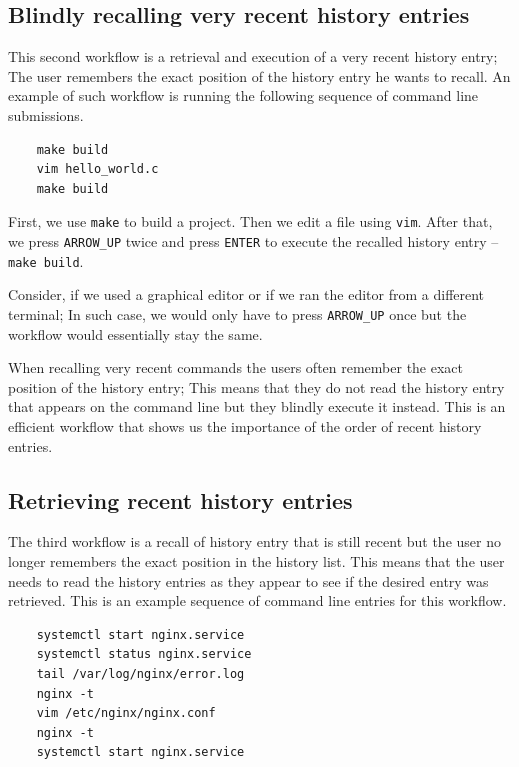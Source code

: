 \documentclass[thesis=M,english]{FITthesis}[2012/10/20]
\newcommand{\todotext}[1]{\textcolor{red}{\textbf{[[#1]]}}}
\begin{document}

\subsection{Blindly recalling very recent history entries}

This second workflow is a retrieval and execution of a very recent history entry; The user remembers the exact position of the history entry he wants to recall. An example of such workflow is running the following sequence of command line submissions.
\begin{verbatim}
    make build
    vim hello_world.c
    make build
\end{verbatim}
First, we use \verb|make| to build a project. Then we edit a file using \verb|vim|. After that, we press \verb|ARROW_UP| twice and press \verb|ENTER| to execute the recalled history entry -- \verb|make build|. 

Consider, if we used a graphical editor or if we ran the editor from a different terminal; In such case, we would only have to press \verb|ARROW_UP| once but the workflow would essentially stay the same.

When recalling very recent commands the users often remember the exact position of the history entry; This means that they do not read the history entry that appears on the command line but they blindly execute it instead. This is an efficient workflow that shows us the importance of the order of recent history entries.

\subsection{Retrieving recent history entries}
The third workflow is a recall of history entry that is still recent but the user no longer remembers the exact position in the history list. This means that the user needs to read the history entries as they appear to see if the desired entry was retrieved. This is an example sequence of command line entries for this workflow.

\begin{verbatim}
    systemctl start nginx.service
    systemctl status nginx.service
    tail /var/log/nginx/error.log
    nginx -t
    vim /etc/nginx/nginx.conf
    nginx -t
    systemctl start nginx.service
\end{verbatim}
\end{document}
